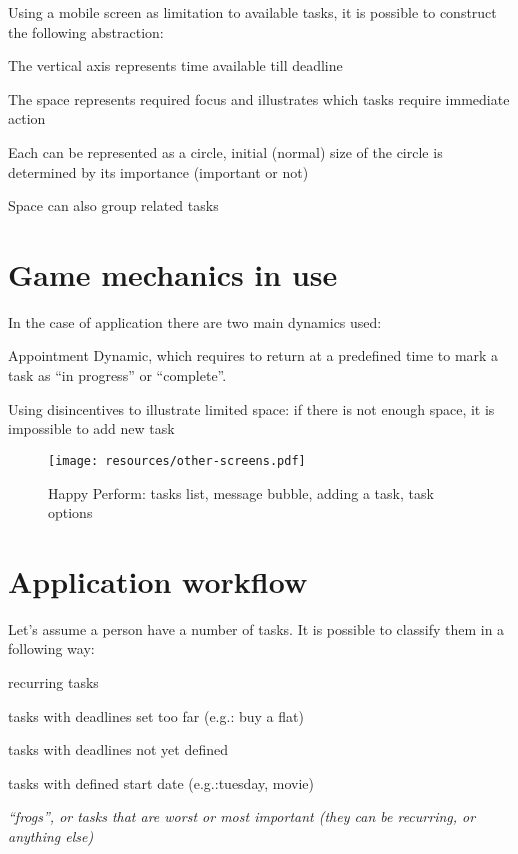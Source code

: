 Using a mobile screen as limitation to available tasks, it is possible to construct the following abstraction:

\begin{compactitem}
\item The vertical axis represents time available till deadline
\item The space represents required focus and illustrates which tasks require immediate action
\item Each can be represented as a circle, initial (normal) size of the circle is determined by its importance (important or not)
\item Space can also group related tasks
\end{compactitem}

\section{Game mechanics in use}

In the case of application there are two main dynamics used:

\begin{compactenum}
\item Appointment Dynamic, which requires to return at a predefined time to mark a task as ``in progress'' or ``complete''.\item Using disincentives to illustrate limited space: if there is not enough space, it is impossible to add new task
\end{compactenum}

\begin{figure}
   \centering
	\texttt{[image: resources/other-screens.pdf]}
	\caption[Happy Perform, other screens]{Happy Perform: tasks list, message bubble, adding a task, task options}
\end{figure}

\section{Application workflow}

Let's assume a person have a number of tasks. It is possible to classify them in a following way: 
\begin{compactenum}
\item recurring tasks
\item tasks with deadlines set too far (e.g.: buy a flat)
\item tasks with deadlines not yet defined
\item tasks with defined start date (e.g.:tuesday, movie)
\item \em ``frogs'', or tasks that are worst or most important (they can be recurring, or anything else)
\end{compactenum}

